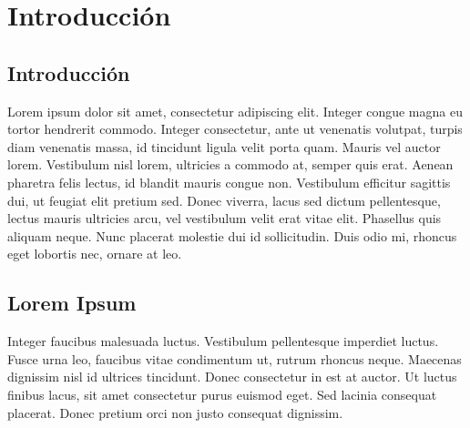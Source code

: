 
\chapter{Introducción} %

\label{Chapter1} %



\section{Introducción}

Lorem ipsum dolor sit amet, consectetur adipiscing elit. Integer congue magna eu tortor hendrerit commodo. Integer consectetur, ante ut venenatis volutpat, turpis diam venenatis massa, id tincidunt ligula velit porta quam. Mauris vel auctor lorem. Vestibulum nisl lorem, ultricies a commodo at, semper quis erat. Aenean pharetra felis lectus, id blandit mauris congue non. Vestibulum efficitur sagittis dui, ut feugiat elit pretium sed. Donec viverra, lacus sed dictum pellentesque, lectus mauris ultricies arcu, vel vestibulum velit erat vitae elit. Phasellus quis aliquam neque. Nunc placerat molestie dui id sollicitudin. Duis odio mi, rhoncus eget lobortis nec, ornare at leo.




\section{Lorem Ipsum}

Integer faucibus malesuada luctus. Vestibulum pellentesque imperdiet luctus. Fusce urna leo, faucibus vitae condimentum ut, rutrum rhoncus neque. Maecenas dignissim nisl id ultrices tincidunt. Donec consectetur in est at auctor. Ut luctus finibus lacus, sit amet consectetur purus euismod eget. Sed lacinia consequat placerat. Donec pretium orci non justo consequat dignissim.\\


